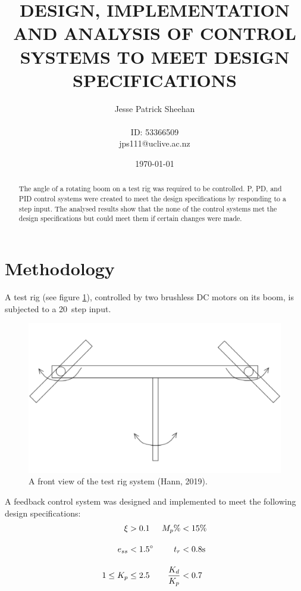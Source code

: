\documentclass[12pt]{article} %
\title{\uppercase{
	Design, Implementation and Analysis of Control Systems to meet design specifications
}}
\date{\today}
\author{
	Jesse Patrick Sheehan\\
	\\
	{\small{ID: 53366509}}\\
	{\small{jps111@uclive.ac.nz}}\\
}
\begin{document}
\maketitle

\vfill

\begin{abstract}


\noindent The angle of a rotating boom on a test rig was required to be controlled.
P, PD, and PID control systems were created to meet the design specifications by responding to a step input.
The analysed results show that the none of the control systems met the design specifications but could meet them if certain changes were made.

\end{abstract}

\newpage

\section*{Methodology}

A test rig (see figure \ref{fig:test-rig}), controlled by two brushless DC motors on its boom, is subjected to a 20\degree\ step input.

\begin{figure}[H]
	\centering
	\includegraphics[scale=0.8]{test-rig}
	\caption{A front view of the test rig system (Hann, 2019).}
	\label{fig:test-rig}
\end{figure}

\noindent A feedback control system was designed and implemented to meet the following design specifications:
\begin{align*}
\xi &> 0.1 & M_p\% &< 15\%  \\[1em]
e_{ss} &< 1.5\degree & t_r &< 0.8 \textrm{s} \\[1em]
1 \leq K_p &\leq 2.5 & \frac{K_d}{K_p} &< 0.7
\end{align*}
\end{document}
